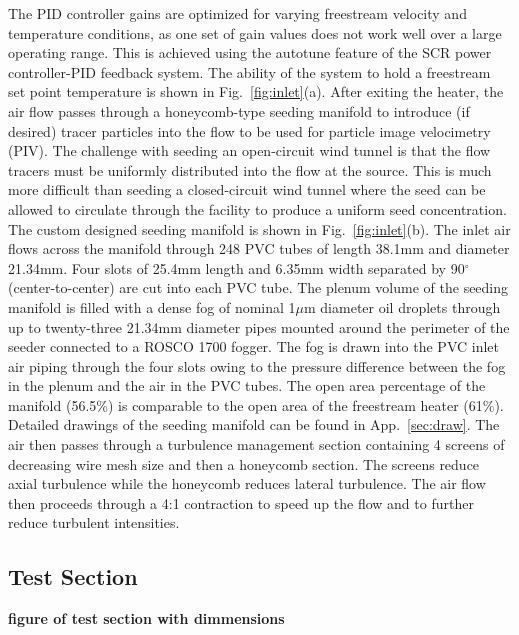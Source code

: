 The PID controller gains are optimized for varying freestream velocity and temperature conditions, as one set of gain values does not work well over a large operating range. 
This is achieved using the autotune feature of the SCR power controller-PID feedback system. 
The ability of the system to hold a freestream set point temperature is shown in Fig.~\ref{fig:inlet}(a). 
After exiting the heater, the air flow passes through a honeycomb-type seeding manifold to introduce (if desired) tracer particles into the flow to be used for particle image velocimetry (PIV).
The challenge with seeding an open-circuit wind tunnel is that the flow tracers must be uniformly distributed into the flow at the source. 
This is much more difficult than seeding a closed-circuit wind tunnel where the seed can be allowed to circulate through the facility to produce a uniform seed concentration. 
The custom designed seeding manifold is shown in Fig.~\ref{fig:inlet}(b). 
The inlet air flows across the manifold through 248 PVC tubes of length 38.1mm and diameter 21.34mm. 
Four slots of 25.4mm length and 6.35mm width separated by 90$^\circ$ (center-to-center) are cut into each PVC tube. 
The plenum volume of the seeding manifold is filled with a dense fog of nominal 1$\mu$m  diameter oil droplets \cite{Shakerin1995} through up to twenty-three 21.34mm diameter pipes mounted around the perimeter of the seeder connected to a ROSCO 1700 fogger. 
The fog is drawn into the PVC inlet air piping through the four slots owing to the pressure difference between the fog in the plenum and the air in the PVC tubes. 
The open area percentage of the manifold (56.5\%) is comparable to the open area of the freestream heater (61\%). 
Detailed drawings of the seeding manifold can be found in App.~\ref{sec:draw}.
The air then passes through a turbulence management section containing 4 screens of decreasing wire mesh size and then a honeycomb section.
The screens reduce axial turbulence while the honeycomb reduces lateral turbulence.
The air flow then proceeds through a 4:1 contraction to speed up the flow and to further reduce turbulent intensities.

\subsection{Test Section}
{\bf figure of test section with dimmensions}\\

